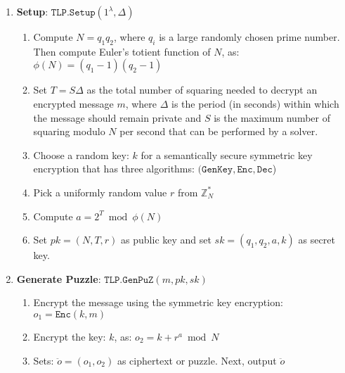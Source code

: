 \begin{enumerate}[leftmargin=.43cm]
\item \textbf{Setup}: $\mathtt{TLP.Setup}(1^{\scriptscriptstyle\lambda}, \Delta)$
\begin{enumerate}


\item Compute $N=q_{\scriptscriptstyle 1}q_{\scriptscriptstyle 2}$, where $q_{\scriptscriptstyle i}$  is a large randomly chosen prime number. Then   compute Euler's totient function of $N$, as: $\phi(N)=(q_{\scriptscriptstyle 1}-1)(q_{\scriptscriptstyle 2}-1)$ 
\item  Set  $T=S\Delta$ as the total number of squaring needed to decrypt an encrypted message $m$, where $\Delta$ is the period (in seconds) within  which the message should remain private and $S$ is the maximum  number of squaring modulo $N$ per second that can be performed by a solver. 
\item  Choose a random key: $k$ for a semantically secure symmetric key encryption   that has  three algorithms: $(\mathtt{GenKey}, \mathtt{Enc},\mathtt{Dec}$) 
\item Pick a uniformly random value $r$ from  $\mathbb{Z}^{\scriptscriptstyle *}_{\scriptscriptstyle N} $
\item Compute $a=2^{\scriptscriptstyle T}\bmod \phi(N)$
\item Set $pk=(N,T,r)$ as  public key and set $sk=(q_{\scriptscriptstyle 1},q_{\scriptscriptstyle 2},a,k)$ as secret key.
\end{enumerate}

\item\label{Generate-Puzzle-} \textbf{Generate Puzzle}: $\mathtt{TLP.GenPuZ}(m,pk,sk)$ %

\begin{enumerate}
\item\label{R-TLP::enc-message}  Encrypt the message using the symmetric key encryption: $o_{\scriptscriptstyle 1}= \mathtt{Enc}(k,m)$
\item Encrypt the key: $k$, as: $o_{\scriptscriptstyle 2}= k+r^{\scriptscriptstyle a}\bmod N$
\item Sets: $\ddot{o}=(o_{\scriptscriptstyle 1},o_{\scriptscriptstyle 2})$ as ciphertext or puzzle. Next, output $\ddot{o}$
\end{enumerate}





\end{enumerate}
